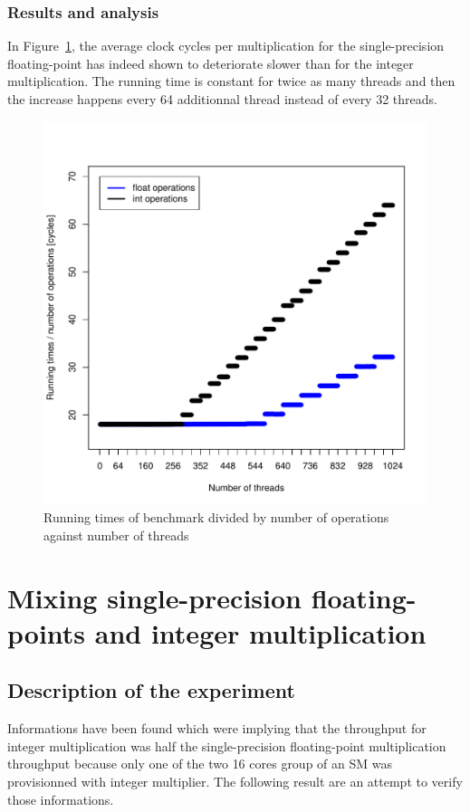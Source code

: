 \documentclass{article}
\def \scalingfactor{.8}
\begin{document}
	\subsubsection{Results and analysis}
	In Figure~\ref{fig:latencyestimate}, the average clock cycles per multiplication for the single-precision floating-point has indeed shown to deteriorate slower than for the integer multiplication. The running time is constant for twice as many threads and then the increase happens every 64 additionnal thread instead of every 32 threads.
	\begin{figure}[h]
		\centering
		\vspace{-20pt}
    			\includegraphics[width=\scalingfactor\linewidth]{"graphics/latency_estimate"}
		\vspace{-15pt}
		\caption{Running times of benchmark divided by number of operations against number of threads}
		\label{fig:latencyestimate}
	\end{figure}
	\pagebreak

\section{Mixing single-precision floating-points and integer multiplication}
	\subsection{Description of the experiment}
	Informations have been found which were implying that the throughput for integer multiplication was half the single-precision floating-point multiplication throughput because only one of the two 16 cores group of an SM was provisionned with integer multiplier.
	The following result are an attempt to verify those informations.
\end{document}
